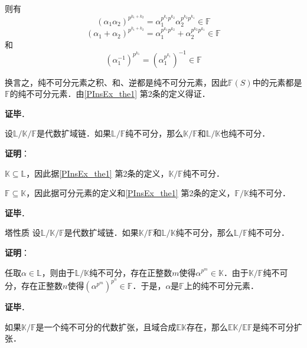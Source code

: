 则有
\begin{equation}\label{PInsEx_eq1}
(\alpha_1\alpha_2)^{p^{k_1+k_2}}=\alpha_1^{p^{k_1}p^{k_2}}\alpha_2^{p^{k_2}p^{k_1}}\in\mathbb{F}
\end{equation}
\begin{equation}\label{PInsEx_eq2}
(\alpha_1+\alpha_2)^{p^{k_1+k_2}}=\alpha_1^{p^{k_1}p^{k_2}}+\alpha_2^{p^{k_2}p^{k_1}}\in\mathbb{F}
\end{equation}
和
\begin{equation}\label{PInsEx_eq3}
(\alpha_1^{-1})^{p^{k_1}} = (\alpha_1^{p^{k_1}})^{-1} \in\mathbb{F}
\end{equation}

换言之，纯不可分元素之积、和、逆都是纯不可分元素，因此$\mathbb{F}(S)$中的元素都是$\mathbb{F}$的纯不可分元素．由\autoref{PInsEx_the1} 第2条的定义得证．

\textbf{证毕}．




\begin{theorem}{}
设$\mathbb{L}/\mathbb{K}/\mathbb{F}$是代数扩域链．如果$\mathbb{L}/\mathbb{F}$纯不可分，那么$\mathbb{K}/\mathbb{F}$和$\mathbb{L}/\mathbb{K}$也纯不可分．
\end{theorem}

\textbf{证明}：

$\mathbb{K}\subseteq\mathbb{L}$，因此据\autoref{PInsEx_the1} 第2条的定义，$\mathbb{K}/\mathbb{F}$纯不可分．

$\mathbb{F}\subseteq\mathbb{K}$，因此据可分元素的定义和\autoref{PInsEx_the1} 第2条的定义，$\mathbb{F}/\mathbb{K}$纯不可分．


\textbf{证毕}．


\begin{theorem}{塔性质}
设$\mathbb{L}/\mathbb{K}/\mathbb{F}$是代数扩域链．如果$\mathbb{K}/\mathbb{F}$和$\mathbb{L}/\mathbb{K}$纯不可分，那么$\mathbb{L}/\mathbb{F}$纯不可分．
\end{theorem}

\textbf{证明}：

任取$\alpha\in\mathbb{L}$，则由于$\mathbb{L}/\mathbb{K}$纯不可分，存在正整数$m$使得$\alpha^{p^m}\in\mathbb{K}$．由于$\mathbb{K}/\mathbb{F}$纯不可分，存在正整数$n$使得$(\alpha^{p^m})^{p^n}\in\mathbb{F}$．于是，$\alpha$是$\mathbb{F}$上的纯不可分元素．

\textbf{证毕}．


\begin{theorem}{}
如果$\mathbb{K}/\mathbb{F}$是一个纯不可分的代数扩张，且域合成$\mathbb{EK}$存在，那么$\mathbb{EK}/\mathbb{EF}$是纯不可分扩张．
\end{theorem}

